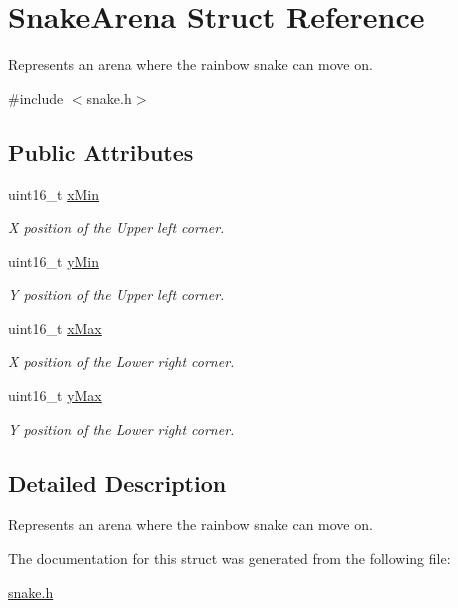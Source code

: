 \hypertarget{struct_snake_arena}{}\section{Snake\+Arena Struct Reference}
\label{struct_snake_arena}


Represents an arena where the rainbow snake can move on.  




{\ttfamily \#include $<$snake.\+h$>$}

\subsection*{Public Attributes}
\begin{DoxyCompactItemize}
\item 
uint16\+\_\+t \mbox{\hyperlink{group__snake_gac0ebaa81c65de20a87951b73f9681ca1}{x\+Min}}
\begin{DoxyCompactList}\small\item\em X position of the Upper left corner. \end{DoxyCompactList}\item 
uint16\+\_\+t \mbox{\hyperlink{group__snake_ga7e608098f74d891fb16367603bd4db33}{y\+Min}}
\begin{DoxyCompactList}\small\item\em Y position of the Upper left corner. \end{DoxyCompactList}\item 
uint16\+\_\+t \mbox{\hyperlink{group__snake_ga30a82bd4fdcd55e4ad4c85a597b39e5e}{x\+Max}}
\begin{DoxyCompactList}\small\item\em X position of the Lower right corner. \end{DoxyCompactList}\item 
uint16\+\_\+t \mbox{\hyperlink{group__snake_ga46349d738f8a96533df9e57ece666fbc}{y\+Max}}
\begin{DoxyCompactList}\small\item\em Y position of the Lower right corner. \end{DoxyCompactList}\end{DoxyCompactItemize}


\subsection{Detailed Description}
Represents an arena where the rainbow snake can move on. 

The documentation for this struct was generated from the following file\+:\begin{DoxyCompactItemize}
\item 
\mbox{\hyperlink{snake_8h}{snake.\+h}}\end{DoxyCompactItemize}
